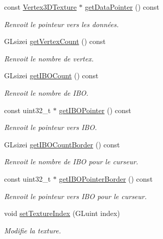 \begin{DoxyCompactItemize}
const \hyperlink{structglimac_1_1Vertex3DTexture}{Vertex3\+D\+Texture} $\ast$ \hyperlink{classglimac_1_1Cube_a29357c655008183dacf647cb3c6fcb12}{get\+Data\+Pointer} () const
\begin{DoxyCompactList}\small\item\em Renvoit le pointeur vers les données. \end{DoxyCompactList}\item 
G\+Lsizei \hyperlink{classglimac_1_1Cube_a579f0c59b840981a71c3fb068d290bfc}{get\+Vertex\+Count} () const
\begin{DoxyCompactList}\small\item\em Renvoit le nombre de vertex. \end{DoxyCompactList}\item 
G\+Lsizei \hyperlink{classglimac_1_1Cube_a15f4c706a6958d1e06479c0c1a743b8c}{get\+I\+B\+O\+Count} () const
\begin{DoxyCompactList}\small\item\em Renvoit le nombre de I\+BO. \end{DoxyCompactList}\item 
const uint32\+\_\+t $\ast$ \hyperlink{classglimac_1_1Cube_a71a64cda0b1ed4f733d9d8132b2866b4}{get\+I\+B\+O\+Pointer} () const
\begin{DoxyCompactList}\small\item\em Renvoit le pointeur vers I\+BO. \end{DoxyCompactList}\item 
G\+Lsizei \hyperlink{classglimac_1_1Cube_af5e5d77fd2bd354383d7b448234d5286}{get\+I\+B\+O\+Count\+Border} () const
\begin{DoxyCompactList}\small\item\em Renvoit le nombre de I\+BO pour le curseur. \end{DoxyCompactList}\item 
const uint32\+\_\+t $\ast$ \hyperlink{classglimac_1_1Cube_a93dd4105228440066a216b95697648ad}{get\+I\+B\+O\+Pointer\+Border} () const
\begin{DoxyCompactList}\small\item\em Renvoit le pointeur vers I\+BO pour le curseur. \end{DoxyCompactList}\item 
void \hyperlink{classglimac_1_1Cube_a6fad01deefdf4c607e114ef4d80f1a33}{set\+Texture\+Index} (G\+Luint index)
\begin{DoxyCompactList}\small\item\em Modifie la texture. \end{DoxyCompactList}\item 

\end{DoxyCompactItemize}
